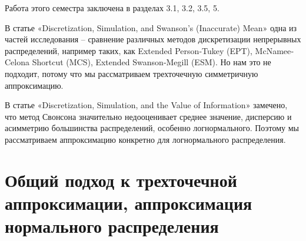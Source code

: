 \documentclass[12pt]{article}
\begin{document}
	Работа этого семестра заключена в разделах 3.1, 3.2, 3.5, 5.
	
	В статье «Discretization, Simulation, and Swanson's (Inaccurate) Mean» \cite{Discretization} одна из частей исследования -- сравнение различных методов дискретизации непрерывных распределений, например таких, как Extended Person‐Tukey (EPT), McNamee‐Celona Shortcut (MCS), Extended Swanson‐Megill (ESM). Но нам это не подходит, потому что мы рассматриваем трехточечную симметричную аппроксимацию.
	
	В статье «Discretization, Simulation, and the Value of Information» \cite{Simulation} замечено, что метод Свонсона значительно недооценивает среднее значение, дисперсию и асимметрию большинства распределений, особенно логнормального. Поэтому мы рассматриваем аппроксимацию конкретно для логнормального распределения.
	
	\section{Общий подход к трехточечной аппроксимации, аппроксимация нормального распределения}
	
\end{document}
